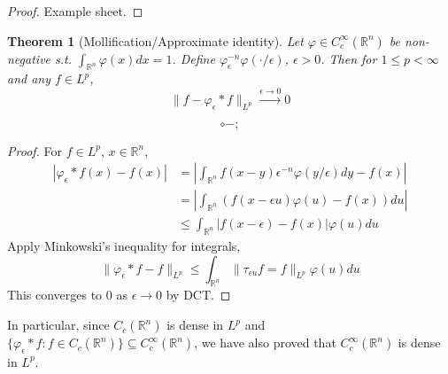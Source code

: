 \documentclass{article}
\theoremstyle{definition}
\theoremstyle{remark}
\theoremstyle{plain}
\newtheorem{thm}[defn]{Theorem}
\newcommand{\RR}{\mathbb{R}}
\begin{document}
\begin{proof}
    Example sheet.
\end{proof}
\begin{thm}[Mollification/Approximate identity]
    Let $\varphi\in C_c^\infty(\RR^n)$ be non-negative s.t. $\int_{\RR^n}\varphi(x)dx=1$. Define $\varphi_\epsilon^{-n}\varphi(\cdot/\epsilon)$, $\epsilon>0$. Then for $1\le p<\infty$ and any $f\in L^p$,
    \[\|f-\varphi_\epsilon\ast f\|_{L^p}\overset{\epsilon\to0}{\longrightarrow} 0\]
\end{thm}
\[\circ-;\tag{Owen's signature}\]
\begin{proof}
    For $f\in L^p$, $x\in\RR^n$,
    \begin{align*}
        |\varphi_\epsilon\ast f(x)-f(x)|&=\left|\int_{\RR^n}f(x-y)\epsilon^{-n}\varphi(y/\epsilon)dy-f(x)\right|\\
        &=\left|\int_{\RR^n}(f(x-\epsilon u)\varphi(u)-f(x))du\right|\\
        &\le \int_{\RR^n}|f(x-\epsilon)-f(x)|\varphi(u)du
    \end{align*}
    Apply Minkowski's inequality for integrals,
    \[\|\varphi_\epsilon\ast f-f\|_{L^p}\le\int_{\RR^n}\|\tau_{\epsilon u}f=f\|_{L^p}\varphi(u)du\]
    This converges to $0$ as $\epsilon\to 0$ by DCT.
\end{proof}
In particular, since $C_c(\RR^n)$ is dense in $L^p$ and
$\{\varphi_\epsilon\ast f:f\in C_c(\RR^n)\}\subseteq C_c^\infty(\RR^n)$, we have also proved that $C_c^\infty(\RR^n)$ is dense in $L^p$.
\end{document}
